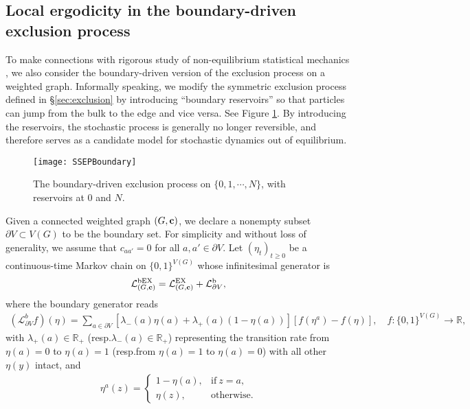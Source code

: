 \documentclass[11pt]{amsart}
\theoremstyle{plain}
\theoremstyle{definition}
\theoremstyle{remark}
\begin{document}
\subsection{Local ergodicity in the boundary-driven exclusion process} \label{sec:mainboundary}

To make connections with rigorous study of non-equilibrium statistical mechanics \cites{ABDS13, BodineauLagouge, BDAdditivity, BDGJL03, BDGJL07, BDGJL15}, we also consider the boundary-driven version of the exclusion process on a weighted graph. Informally speaking, we modify the symmetric exclusion process  defined in \S\ref{sec:exclusion} by introducing ``boundary reservoirs'' so that particles can jump from the bulk to the edge and vice versa. See Figure \ref{fig:BD}. By introducing the reservoirs, the stochastic process is generally no longer reversible, and therefore serves as a candidate model for stochastic dynamics out of equilibrium.

\begin{figure}
\centering
\texttt{[image: SSEPBoundary]}
\caption{The boundary-driven exclusion process on $\{0, 1,\cdots, N\}$, with reservoirs at $0$ and $N$.}
\label{fig:BD}
\end{figure}

Given a connected weighted graph $(G, {\bf c})$, we declare a nonempty subset $\partial V \subset V(G)$ to be the boundary set. For simplicity and without loss of generality, we assume that $c_{aa'}=0$ for all $a,a' \in \partial V$. Let $(\eta_t)_{t\geq 0}$ be a continuous-time Markov chain on $\{0,1\}^{V(G)}$ whose infinitesimal generator is 
\begin{align}
\label{eq:gen}
\mathcal{L}^{\rm bEX}_{(G,{\bf c})} = \mathcal{L}^{\rm EX}_{(G,{\bf c})} + \mathcal{L}^{\rm b}_{\partial V},
\end{align}
where the boundary generator reads
\begin{align}
(\mathcal{L}^b_{\partial V} f)(\eta)  = \sum_{a\in \partial V} [\lambda_-(a) \eta(a) + \lambda_+(a) (1-\eta(a))] [ f(\eta^a)-f(\eta)], \quad f: \{0,1\}^{V(G)} \to\mathbb{R},
\end{align}
with $\lambda_+(a) \in \mathbb{R}_+$ (resp.\@ $\lambda_-(a) \in \mathbb{R}_+$) representing the transition rate from $\eta(a)=0$ to $\eta(a)=1$ (resp.\@ from $\eta(a)=1$ to $\eta(a)=0$) with all other $\eta(y)$ intact, and
\begin{align}
\eta^a(z) = \left\{\begin{array}{ll} 1-\eta(a),& \text{if}~z=a,\\ \eta(z), & \text{otherwise.}\end{array}\right.
\end{align}
\end{document}
